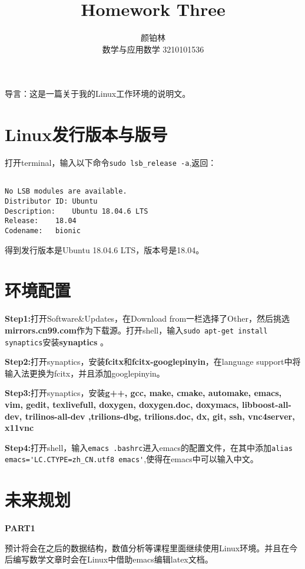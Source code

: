 \documentclass{ctexart}
\title{Homework Three}
\author{颜铂林 \\ 数学与应用数学 3210101536}
\begin{document}
\begin{sloppypar}

\maketitle


导言：这是一篇关于我的Linux工作环境的说明文。

\section*{Linux发行版本与版号}

打开terminal，输入以下命令\verb!sudo lsb_release -a!,返回：

\begin{verbatim}

No LSB modules are available.
Distributor ID:	Ubuntu
Description:	Ubuntu 18.04.6 LTS
Release:	18.04
Codename:	bionic

\end{verbatim}

得到发行版本是Ubuntu 18.04.6 LTS，版本号是18.04。

\section*{环境配置}

\textbf{Step1:}打开Software\&Updates，在Download from一栏选择了Other，然后挑选\textbf{mirrors.cn99.com}作为下载源。打开shell，输入\verb|sudo apt-get install synaptics|安装\textbf{synaptics} 。

\textbf{Step2:}打开synaptics，安装\textbf{fcitx}和\textbf{fcitx-googlepinyin}，在language support中将输入法更换为fcitx，并且添加googlepinyin。

\textbf{Step3:}打开synaptics，安装\textbf{g++, gcc, make, cmake, automake, emacs, vim, gedit, texlivefull, doxygen, doxygen.doc, doxymacs, libboost-all-dev, trilinos-all-dev ,trilions-dbg, trilions.doc, dx, git, ssh, vnc4server, x11vnc}

\textbf{Step4:}打开shell，输入\verb|emacs .bashrc|进入emacs的配置文件，在其中添加\verb|alias emacs='LC.CTYPE=zh_CN.utf8 emacs'|,使得在emacs中可以输入中文。

\section*{未来规划}

\textbf{PART1}

预计将会在之后的数据结构，数值分析等课程里面继续使用Linux环境。并且在今后编写数学文章时会在Linux中借助emacs编辑latex文档。


\end{sloppypar}
\end{document}
